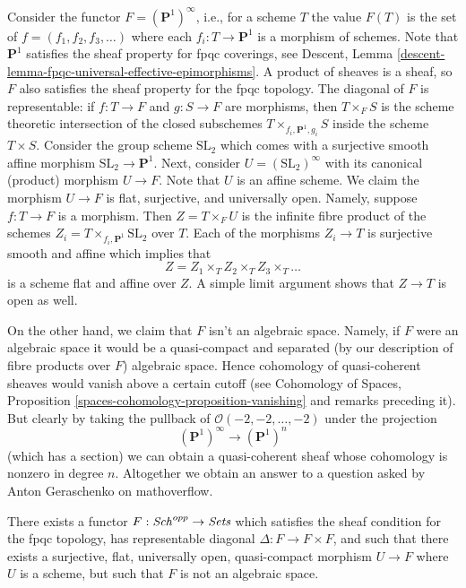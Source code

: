 \noindent
Consider the functor $F = (\mathbf{P}^1)^\infty$, i.e., for a scheme $T$
the value $F(T)$ is the set of $f = (f_1, f_2, f_3, \ldots)$ where each
$f_i : T \to \mathbf{P}^1$ is a morphism of schemes. Note that
$\mathbf{P}^1$ satisfies the sheaf property for fpqc coverings, see
Descent, Lemma \ref{descent-lemma-fpqc-universal-effective-epimorphisms}.
A product of sheaves is a sheaf, so $F$ also satisfies the sheaf property for
the fpqc topology. The diagonal of $F$ is representable: if $f : T \to F$
and $g : S \to F$ are morphisms, then $T \times_F S$ is the scheme theoretic
intersection of the closed subschemes $T \times_{f_i, \mathbf{P}^1, g_i} S$
inside the scheme $T \times S$. Consider the group scheme $\text{SL}_2$ which
comes with a surjective smooth affine morphism $\text{SL}_2 \to \mathbf{P}^1$.
Next, consider $U = (\text{SL}_2)^\infty$ with its canonical (product) morphism
$U \to F$. Note that $U$ is an affine scheme. We claim the morphism
$U \to F$ is flat, surjective, and universally open. Namely, suppose
$f : T \to F$ is a morphism. Then $Z = T \times_F U$ is the infinite
fibre product of the schemes $Z_i = T \times_{f_i, \mathbf{P}^1} \text{SL}_2$
over $T$. Each of the morphisms $Z_i \to T$ is surjective smooth and
affine which implies that
$$
Z = Z_1 \times_T Z_2 \times_T Z_3 \times_T \ldots
$$
is a scheme flat and affine over $Z$. A simple limit argument shows that
$Z \to T$ is open as well.

\medskip\noindent
On the other hand, we claim that $F$ isn't an algebraic space.
Namely, if $F$ were an algebraic space it would be a quasi-compact
and separated (by our description of fibre products over $F$) algebraic
space. Hence cohomology of quasi-coherent sheaves would vanish above a
certain cutoff (see
Cohomology of Spaces, Proposition \ref{spaces-cohomology-proposition-vanishing}
and remarks preceding it). But clearly by taking the pullback
of $\mathcal{O}(-2, -2, \ldots, -2)$ under the projection
$$
(\mathbf{P}^1)^\infty \longrightarrow (\mathbf{P}^1)^n
$$
(which has a section) we can obtain a quasi-coherent sheaf whose cohomology
is nonzero in degree $n$. Altogether we obtain an answer to a question asked
by Anton Geraschenko on mathoverflow.

\begin{lemma}
\label{lemma-not-algebraic}
There exists a functor $F : \mathit{Sch}^{opp} \to \textit{Sets}$
which satisfies the sheaf condition for the fpqc topology, has representable
diagonal $\Delta : F \to F \times F$, and such that there exists a
surjective, flat, universally open, quasi-compact morphism
$U \to F$ where $U$ is a scheme, but such that $F$ is not an algebraic space.
\end{lemma}

